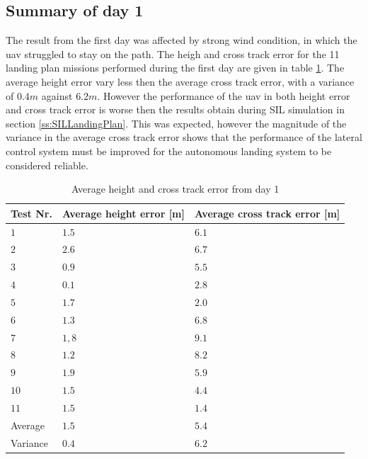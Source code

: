 \subsection{Summary of day 1}\label{sss:summaryDay1}
The result from the first day was affected by strong wind condition, in which the \gls{uav} struggled to stay on the path. The heigh and cross track error for the 11 landing plan missions performed during the first day are given in table \ref{tb:Day1HeightCrossTrack}. The average height error vary less then the average cross track error, with a variance of $0.4 m$ against $6.2 m$. However the performance of the \gls{uav} in both height error and cross track error is worse then the results obtain during SIL simulation in section \ref{ss:SILLandingPlan}. This was expected, however the magnitude of the variance in the average cross track error shows that the performance of the lateral control system must be improved for the autonomous landing system to be considered reliable.
\begin{table}[H]
\centering
\begin{tabular}{| l | l | l |}
\hline
\textbf{Test Nr.} 	& \textbf{Average height error [m]} 	& \textbf{Average cross track error [m]}  \\ \hline
$1$				& $1.5$							& $6.1$								\\ \hline
$2$				& $2.6$							& $6.7$								\\ \hline
$3$				& $0.9$							& $5.5$								\\ \hline
$4$				& $0.1$							& $2.8$								\\ \hline
$5$				& $1.7$							& $2.0$								\\ \hline
$6$				& $1.3$							& $6.8$								\\ \hline
$7$				& $1,8$							& $9.1$								\\ \hline
$8$				& $1.2$							& $8.2$								\\ \hline
$9$				& $1.9$							& $5.9$								\\ \hline
$10$			& $1.5$							& $4.4$								\\ \hline
$11$			& $1.5$							& $1.4$								\\ \hline \hline
Average			& $1.5$							& $5.4$								\\ \hline
Variance		& $0.4$							& $6.2$								\\ \hline
\end{tabular}
\caption{Average height and cross track error from day 1}
\label{tb:Day1HeightCrossTrack}
\end{table}
